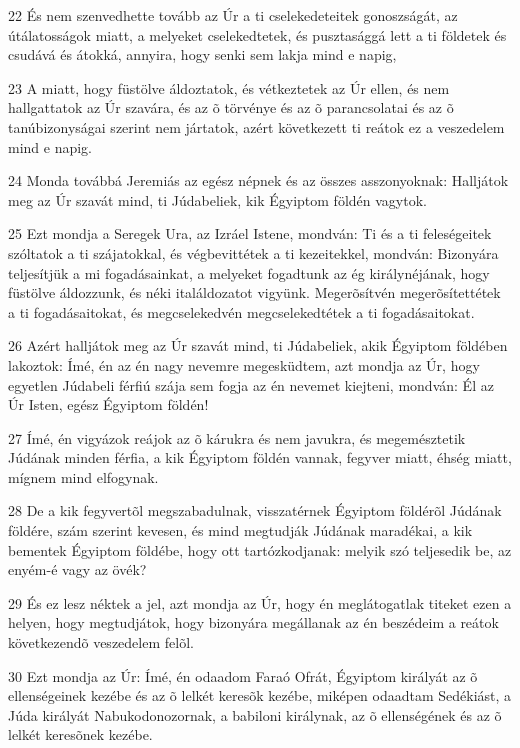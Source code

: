 \par 22 És nem szenvedhette tovább az Úr a ti cselekedeteitek gonoszságát, az útálatosságok miatt, a melyeket cselekedtetek, és pusztasággá lett a ti földetek és csudává és átokká, annyira, hogy senki sem lakja mind e napig,
\par 23 A miatt, hogy füstölve áldoztatok, és vétkeztetek az Úr ellen, és nem hallgattatok az Úr szavára, és az õ törvénye és az õ parancsolatai és az õ tanúbizonyságai szerint nem jártatok, azért következett ti reátok ez a veszedelem mind e napig.
\par 24 Monda továbbá Jeremiás az egész népnek és az összes asszonyoknak: Halljátok meg az Úr szavát mind, ti Júdabeliek, kik Égyiptom földén vagytok.
\par 25 Ezt mondja a Seregek Ura, az Izráel Istene, mondván: Ti és a ti feleségeitek szóltatok a ti szájatokkal, és végbevittétek a ti kezeitekkel, mondván: Bizonyára teljesítjük a mi fogadásainkat, a melyeket fogadtunk az ég királynéjának, hogy füstölve áldozzunk, és néki italáldozatot vigyünk. Megerõsítvén megerõsítettétek a ti fogadásaitokat, és megcselekedvén megcselekedtétek a ti fogadásaitokat.
\par 26 Azért halljátok meg az Úr szavát mind, ti Júdabeliek, akik Égyiptom földében lakoztok: Ímé, én az én nagy nevemre megesküdtem, azt mondja az Úr, hogy egyetlen Júdabeli férfiú szája sem fogja az én nevemet kiejteni, mondván: Él az Úr Isten, egész Égyiptom földén!
\par 27 Ímé, én vigyázok reájok az õ kárukra és nem javukra, és megemésztetik Júdának minden férfia, a kik Égyiptom földén vannak, fegyver miatt, éhség miatt, mígnem mind elfogynak.
\par 28 De a kik fegyvertõl megszabadulnak, visszatérnek Égyiptom földérõl Júdának földére, szám szerint kevesen, és mind megtudják Júdának maradékai, a kik bementek Égyiptom földébe, hogy ott tartózkodjanak: melyik szó teljesedik be, az enyém-é vagy az övék?
\par 29 És ez lesz néktek a jel, azt mondja az Úr, hogy én meglátogatlak titeket ezen a helyen, hogy megtudjátok, hogy bizonyára megállanak az én beszédeim a reátok következendõ veszedelem felõl.
\par 30 Ezt mondja az Úr: Ímé, én odaadom Faraó Ofrát, Égyiptom királyát az õ ellenségeinek kezébe és az õ lelkét keresõk kezébe, miképen odaadtam Sedékiást, a Júda királyát Nabukodonozornak, a babiloni királynak, az õ ellenségének és az õ lelkét keresõnek kezébe.

